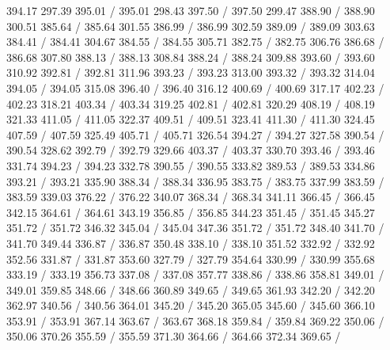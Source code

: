 { 394.17 297.39 395.01 /
 395.01 298.43 397.50 /
 397.50 299.47 388.90 /
 388.90 300.51 385.64 /
 385.64 301.55 386.99 /
 386.99 302.59 389.09 /
 389.09 303.63 384.41 /
 384.41 304.67 384.55 /
 384.55 305.71 382.75 /
 382.75 306.76 386.68 /
 386.68 307.80 388.13 /
 388.13 308.84 388.24 /
 388.24 309.88 393.60 /
 393.60 310.92 392.81 /
 392.81 311.96 393.23 /
 393.23 313.00 393.32 /
 393.32 314.04 394.05 /
 394.05 315.08 396.40 /
 396.40 316.12 400.69 /
 400.69 317.17 402.23 /
 402.23 318.21 403.34 /
 403.34 319.25 402.81 /
 402.81 320.29 408.19 /
 408.19 321.33 411.05 /
 411.05 322.37 409.51 /
 409.51 323.41 411.30 /
 411.30 324.45 407.59 /
 407.59 325.49 405.71 /
 405.71 326.54 394.27 /
 394.27 327.58 390.54 /
 390.54 328.62 392.79 /
 392.79 329.66 403.37 /
 403.37 330.70 393.46 /
 393.46 331.74 394.23 /
 394.23 332.78 390.55 /
 390.55 333.82 389.53 /
 389.53 334.86 393.21 /
 393.21 335.90 388.34 /
 388.34 336.95 383.75 /
 383.75 337.99 383.59 /
 383.59 339.03 376.22 /
 376.22 340.07 368.34 /
 368.34 341.11 366.45 /
 366.45 342.15 364.61 /
 364.61 343.19 356.85 /
 356.85 344.23 351.45 /
 351.45 345.27 351.72 /
 351.72 346.32 345.04 /
 345.04 347.36 351.72 /
 351.72 348.40 341.70 /
 341.70 349.44 336.87 /
 336.87 350.48 338.10 /
 338.10 351.52 332.92 /
 332.92 352.56 331.87 /
 331.87 353.60 327.79 /
 327.79 354.64 330.99 /
 330.99 355.68 333.19 /
 333.19 356.73 337.08 /
 337.08 357.77 338.86 /
 338.86 358.81 349.01 /
 349.01 359.85 348.66 /
 348.66 360.89 349.65 /
 349.65 361.93 342.20 /
 342.20 362.97 340.56 /
 340.56 364.01 345.20 /
 345.20 365.05 345.60 /
 345.60 366.10 353.91 /
 353.91 367.14 363.67 /
 363.67 368.18 359.84 /
 359.84 369.22 350.06 /
 350.06 370.26 355.59 /
 355.59 371.30 364.66 /
 364.66 372.34 369.65 /
}
